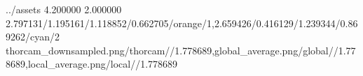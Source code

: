 \TrioComparisonFigure
    {../assets}
    {4.200000}
    {2.000000}
    {2.797131/1.195161/1.118852/0.662705/orange/1,2.659426/0.416129/1.239344/0.869262/cyan/2}
    {thorcam_downsampled.png/thorcam//1.778689,global_average.png/global//1.778689,local_average.png/local//1.778689}
